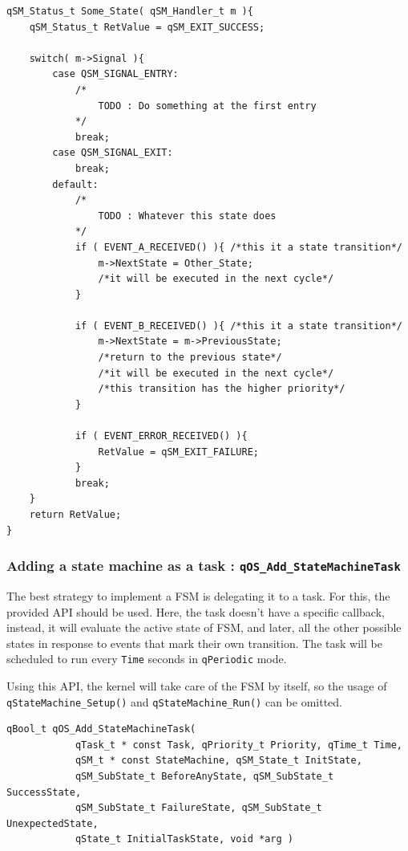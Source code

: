 \documentclass{article}
\begin{document}
\begin{lstlisting}[style=CStyle]
qSM_Status_t Some_State( qSM_Handler_t m ){
    qSM_Status_t RetValue = qSM_EXIT_SUCCESS;
    
    switch( m->Signal ){
        case QSM_SIGNAL_ENTRY:
            /*
                TODO : Do something at the first entry
            */        
            break;
        case QSM_SIGNAL_EXIT:
            break;
        default:
            /*
                TODO : Whatever this state does
            */
            if ( EVENT_A_RECEIVED() ){ /*this it a state transition*/
                m->NextState = Other_State; 
                /*it will be executed in the next cycle*/
            }
            
            if ( EVENT_B_RECEIVED() ){ /*this it a state transition*/
                m->NextState = m->PreviousState; 
                /*return to the previous state*/ 
                /*it will be executed in the next cycle*/
                /*this transition has the higher priority*/
            }       
            
            if ( EVENT_ERROR_RECEIVED() ){ 
                RetValue = qSM_EXIT_FAILURE;
            }
            break;
    }
    return RetValue;
}
\end{lstlisting}  

\subsubsection{Adding a state machine as a task : \lstinline{qOS_Add_StateMachineTask} } \label{statemachinetask}
The best strategy to implement a FSM is delegating it to a task. For this, the provided  API should be used. Here, the task doesn't have a specific callback, instead, it will evaluate the active state of FSM, and later, all the other possible states in response to events that mark their own transition. The task will be scheduled to run every \lstinline{Time} seconds in \lstinline{qPeriodic} mode. 


Using this API, the kernel will take care of the FSM by itself, so the usage of \lstinline{qStateMachine_Setup()} and \lstinline{qStateMachine_Run()} can be omitted. \\

\begin{lstlisting}[style=CStyle]
qBool_t qOS_Add_StateMachineTask( 
            qTask_t * const Task, qPriority_t Priority, qTime_t Time,
            qSM_t * const StateMachine, qSM_State_t InitState, 
            qSM_SubState_t BeforeAnyState, qSM_SubState_t SuccessState, 
            qSM_SubState_t FailureState, qSM_SubState_t UnexpectedState,
            qState_t InitialTaskState, void *arg )
\end{lstlisting}
\end{document}
